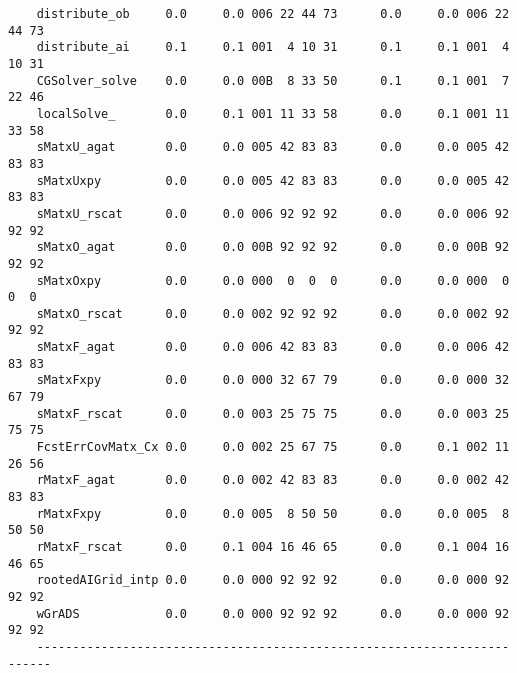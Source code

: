 \begin{verbatim}
    distribute_ob     0.0     0.0 006 22 44 73      0.0     0.0 006 22 44 73
    distribute_ai     0.1     0.1 001  4 10 31      0.1     0.1 001  4 10 31
    CGSolver_solve    0.0     0.0 00B  8 33 50      0.1     0.1 001  7 22 46
    localSolve_       0.0     0.1 001 11 33 58      0.0     0.1 001 11 33 58
    sMatxU_agat       0.0     0.0 005 42 83 83      0.0     0.0 005 42 83 83
    sMatxUxpy         0.0     0.0 005 42 83 83      0.0     0.0 005 42 83 83
    sMatxU_rscat      0.0     0.0 006 92 92 92      0.0     0.0 006 92 92 92
    sMatxO_agat       0.0     0.0 00B 92 92 92      0.0     0.0 00B 92 92 92
    sMatxOxpy         0.0     0.0 000  0  0  0      0.0     0.0 000  0  0  0
    sMatxO_rscat      0.0     0.0 002 92 92 92      0.0     0.0 002 92 92 92
    sMatxF_agat       0.0     0.0 006 42 83 83      0.0     0.0 006 42 83 83
    sMatxFxpy         0.0     0.0 000 32 67 79      0.0     0.0 000 32 67 79
    sMatxF_rscat      0.0     0.0 003 25 75 75      0.0     0.0 003 25 75 75
    FcstErrCovMatx_Cx 0.0     0.0 002 25 67 75      0.0     0.1 002 11 26 56
    rMatxF_agat       0.0     0.0 002 42 83 83      0.0     0.0 002 42 83 83
    rMatxFxpy         0.0     0.0 005  8 50 50      0.0     0.0 005  8 50 50
    rMatxF_rscat      0.0     0.1 004 16 46 65      0.0     0.1 004 16 46 65
    rootedAIGrid_intp 0.0     0.0 000 92 92 92      0.0     0.0 000 92 92 92
    wGrADS            0.0     0.0 000 92 92 92      0.0     0.0 000 92 92 92
    ------------------------------------------------------------------------
\end{verbatim}
